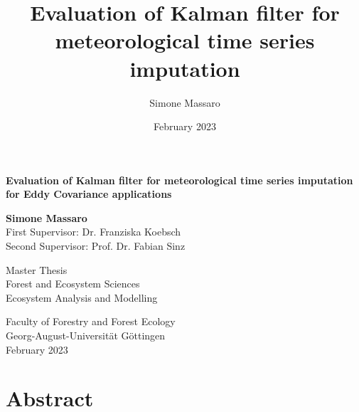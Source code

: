 \documentclass{article}
\title{Evaluation of Kalman filter for meteorological time series imputation}
\author{Simone Massaro}
\date{February 2023}
\let\Oldsection\section
\renewcommand{\section}{\FloatBarrier\Oldsection}
\begin{document}
\newcommand{\vv}[1]{\texttt{#1}}

\begin{titlepage}
    \begin{center}
        \vspace*{1cm}
            
        \Huge
        \textbf{Evaluation of Kalman filter for meteorological time series imputation for Eddy Covariance applications}
            
        \vspace{0.5cm}
        \LARGE
            
        \vspace{1.5cm}
            
        \textbf{Simone Massaro} \\
        \vspace{1cm}
        First Supervisor: Dr. Franziska Koebsch\\
        Second Supervisor: Prof. Dr. Fabian Sinz 
        \vfill
            
        Master Thesis\\
        Forest and Ecosystem Sciences\\
        Ecosystem Analysis and Modelling
            
        \vspace{0.8cm}
            
        \Large
        Faculty of Forestry and Forest Ecology \\
        Georg-August-Universität Göttingen \\
        \vspace{0.3cm}
        February 2023
            
    \end{center}
\end{titlepage}
\clearpage
\tableofcontents
\clearpage

\section*{Abstract}
\end{document}
